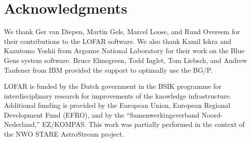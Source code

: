 \documentclass{sig-alternate}
\begin{document}
%
%


\section*{Acknowledgments}
\begin{small}
We thank Ger van Diepen, Martin Gels, Marcel Loose, and Ruud Overeem
for their contributions to the LOFAR software.
We also thank Kamil Iskra and Kazutomo Yoshii from Argonne National Laboratory
for their work on the Blue Gene system software.
Bruce Elmegreen, Todd Inglet, Tom Liebsch, and Andrew Taufener from IBM
provided the support to optimally use the BG/P.

LOFAR is funded by the Dutch government in the BSIK programme for
interdisciplinary research for improvements of the knowledge
infrastructure.  Additional funding is provided by the European Union,
European Regional Development Fund (EFRO), and by the
``Samenwerkingsverband Noord-Nederland,'' EZ/KOMPAS. This work was
partially performed in the context of the NWO STARE AstroStream
project.
\end{small}



\end{document}
